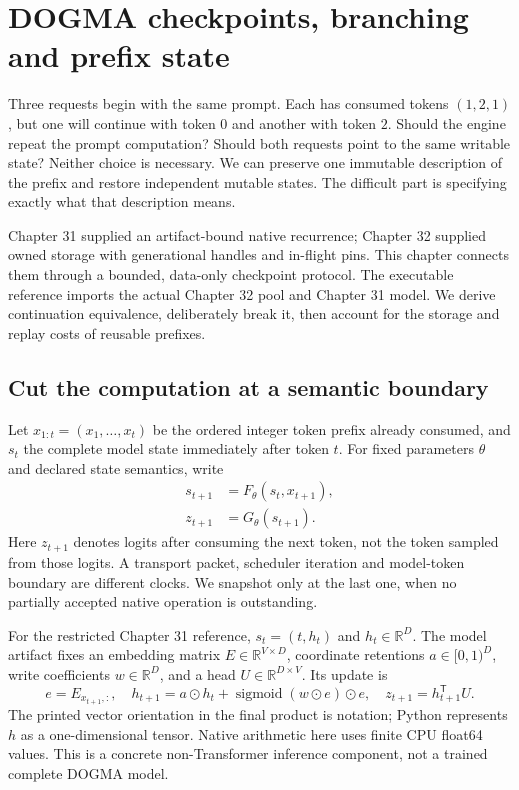 \chapter{DOGMA checkpoints, branching and prefix state}

Three requests begin with the same prompt. Each has consumed tokens
$(1,2,1)$, but one will continue with token $0$ and another with token $2$.
Should the engine repeat the prompt computation? Should both requests point
to the same writable state? Neither choice is necessary. We can preserve one
immutable description of the prefix and restore independent mutable states.
The difficult part is specifying exactly what that description means.

Chapter 31 supplied an artifact-bound native recurrence; Chapter 32 supplied
owned storage with generational handles and in-flight pins. This chapter
connects them through a bounded, data-only checkpoint protocol. The executable
reference imports the actual Chapter 32 pool and Chapter 31 model. We derive
continuation equivalence, deliberately break it, then account for the storage
and replay costs of reusable prefixes.

\section{Cut the computation at a semantic boundary}

Let $x_{1:t}=(x_1,\ldots,x_t)$ be the ordered integer token prefix already
consumed, and $s_t$ the complete model state immediately after token $t$.
For fixed parameters $\theta$ and declared state semantics, write
\begin{align}
 s_{t+1}&=F_\theta(s_t,x_{t+1}),\\
 z_{t+1}&=G_\theta(s_{t+1}).
\end{align}
Here $z_{t+1}$ denotes logits after consuming the next token, not the token
sampled from those logits. A transport packet, scheduler iteration and
model-token boundary are different clocks. We snapshot only at the last one,
when no partially accepted native operation is outstanding.


For the restricted Chapter 31 reference, $s_t=(t,h_t)$ and
$h_t\in\mathbb{R}^D$. The model artifact fixes an embedding matrix
$E\in\mathbb{R}^{V\times D}$, coordinate retentions $a\in[0,1)^D$,
write coefficients $w\in\mathbb{R}^D$, and a head
$U\in\mathbb{R}^{D\times V}$. Its update is
\begin{equation}
 e=E_{x_{t+1},:},\quad
 h_{t+1}=a\odot h_t+\operatorname{sigmoid}(w\odot e)\odot e,
 \quad z_{t+1}=h_{t+1}^{\mathsf T}U.
 \label{eq:native}
\end{equation}
The printed vector orientation in the final product is notation; Python
represents $h$ as a one-dimensional tensor. Native arithmetic here uses
finite CPU float64 values. This is a concrete non-Transformer inference
component, not a trained complete DOGMA model.


